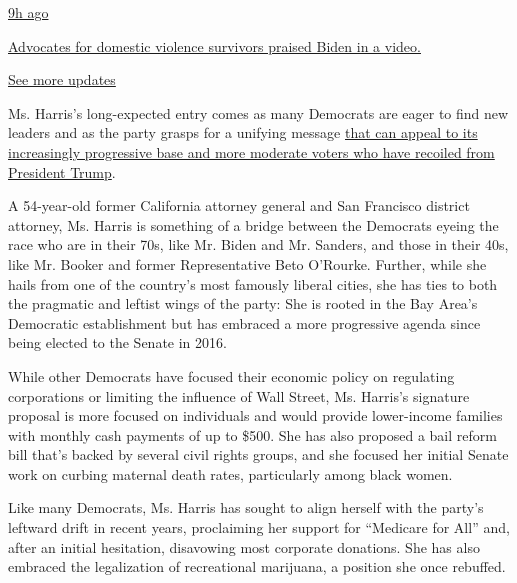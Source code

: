 \href{https://www.nytimes3xbfgragh.onion/live/2020/08/19/us/dnc-convention-election?action=click\&pgtype=Article\&state=default\&region=MAIN_CONTENT_1\&context=storylines_live_updates\#advocates-for-domestic-violence-survivors-praised-biden-in-a-video}{9h
ago}

\href{https://www.nytimes3xbfgragh.onion/live/2020/08/19/us/dnc-convention-election?action=click\&pgtype=Article\&state=default\&region=MAIN_CONTENT_1\&context=storylines_live_updates\#advocates-for-domestic-violence-survivors-praised-biden-in-a-video}{Advocates
for domestic violence survivors praised Biden in a video.}

\href{https://www.nytimes3xbfgragh.onion/live/2020/08/19/us/dnc-convention-election?action=click\&pgtype=Article\&state=default\&region=MAIN_CONTENT_1\&context=storylines_live_updates}{See
more updates}

Ms. Harris's long-expected entry comes as many Democrats are eager to
find new leaders and as the party grasps for a unifying message
\href{https://www.nytimes3xbfgragh.onion/2019/01/14/us/politics/democratic-candidates-issues-2020.html}{that
can appeal to its increasingly progressive base and more moderate voters
who have recoiled from President Trump}.

A 54-year-old former California attorney general and San Francisco
district attorney, Ms. Harris is something of a bridge between the
Democrats eyeing the race who are in their 70s, like Mr. Biden and Mr.
Sanders, and those in their 40s, like Mr. Booker and former
Representative Beto O'Rourke. Further, while she hails from one of the
country's most famously liberal cities, she has ties to both the
pragmatic and leftist wings of the party: She is rooted in the Bay
Area's Democratic establishment but has embraced a more progressive
agenda since being elected to the Senate in 2016.

While other Democrats have focused their economic policy on regulating
corporations or limiting the influence of Wall Street, Ms. Harris's
signature proposal is more focused on individuals and would provide
lower-income families with monthly cash payments of up to \$500. She has
also proposed a bail reform bill that's backed by several civil rights
groups, and she focused her initial Senate work on curbing maternal
death rates, particularly among black women.

Like many Democrats, Ms. Harris has sought to align herself with the
party's leftward drift in recent years, proclaiming her support for
``Medicare for All'' and, after an initial hesitation, disavowing most
corporate donations. She has also embraced the legalization of
recreational marijuana, a position she once rebuffed.

